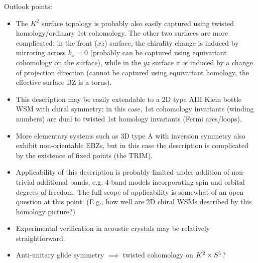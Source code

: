 {\color{blue}
Outlook points:	
	
\begin{itemize}
	\item The $K^2$ surface topology is probably also easily captured using twisted homology/ordinary 1st cohomology. The other two surfaces are more complicated: in the front ($xz$) surface, the chirality change is induced by mirroring across $k_x=0$ (probably can be captured using equivariant cohomology on the surface), while in the $yz$ surface it is induced by a change of projection direction (cannot be captured using equivariant homology, the effective surface BZ is a torus).
	
	\item This description may be easily extendable to a 2D type AIII Klein bottle WSM with chiral symmetry; in this case, 1st cohomology invariants (winding numbers) are dual to twisted 1st homology invariants (Fermi arcs/loops).
	
	\item More elementary systems such as 3D type A with inversion symmetry also exhibit non-orientable EBZs, but in this case the description is complicated by the existence of fixed points (the TRIM).
	
	\item Applicability of this description is probably limited under addition of non-trivial additional bands, e.g. 4-band models incorporating spin and orbital degrees of freedom. The full scope of applicability is somewhat of an open question at this point. (E.g., how well are 2D chiral WSMs described by this homology picture?)
	
	\item Experimental verification in acoustic crystals may be relatively straightforward.
	
	\item Anti-unitary glide symmetry $\implies$ twisted cohomology on $K^2\times S^1$?
\end{itemize}
}



